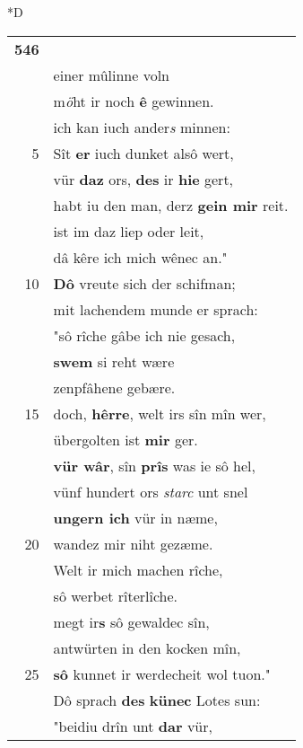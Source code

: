 \documentclass[8pt,a4paper,notitlepage]{article}
\begin{document}
\begin{table}[ht]
\begin{minipage}[t]{0.5\linewidth}
\small
\begin{center}*D
\end{center}
\begin{tabular}{rl}
\textbf{546} & \textbf{\begin{large}E\end{large}ine wîle hete mirz} verstoln.\\ 
 & einer mûlinne voln\\ 
 & m\textit{ö}ht ir noch \textbf{ê} gewinnen.\\ 
 & ich kan iuch ander\textit{s} minnen:\\ 
5 & Sît \textbf{er} iuch dunket alsô wert,\\ 
 & vür \textbf{daz} ors, \textbf{des} ir \textbf{hie} gert,\\ 
 & habt iu den man, derz \textbf{gein mir} reit.\\ 
 & ist im daz liep oder leit,\\ 
 & dâ kêre ich mich wênec an."\\ 
10 & \textbf{Dô} vreute sich der schifman;\\ 
 & mit lachendem munde er sprach:\\ 
 & "sô rîche gâbe ich nie gesach,\\ 
 & \textbf{swem} si reht wære\\ 
 & zenpfâhene gebære.\\ 
15 & doch, \textbf{hêrre}, welt irs sîn mîn wer,\\ 
 & übergolten ist \textbf{mir} ger.\\ 
 & \textbf{vür wâr}, sîn \textbf{prîs} was ie sô hel,\\ 
 & vünf hundert ors \textit{starc} unt snel\\ 
 & \textbf{ungern ich} vür in næme,\\ 
20 & wandez mir niht gezæme.\\ 
 & Welt ir mich machen rîche,\\ 
 & sô werbet rîterlîche.\\ 
 & megt ir\textbf{s} sô gewaldec sîn,\\ 
 & antwürten in den kocken mîn,\\ 
25 & \textbf{sô} kunnet ir werdecheit wol tuon."\\ 
 & Dô sprach \textbf{des} \textbf{künec} Lotes sun:\\ 
 & "beidiu drîn unt \textbf{dar} vür,\\ 

\end{tabular}
\end{minipage}
\end{table}
\end{document}
